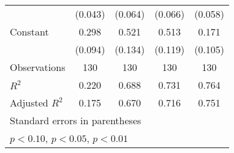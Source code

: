 \begin{table}[htbp]
\begin{tabular}{l*{4}{c}}
                    &     (0.043)         &     (0.064)         &     (0.066)         &     (0.058)         \\
[1em]
Constant            &       0.298\sym{***}&       0.521\sym{***}&       0.513\sym{***}&       0.171         \\
                    &     (0.094)         &     (0.134)         &     (0.119)         &     (0.105)         \\
\hline
Observations        &         130         &         130         &         130         &         130         \\
\(R^{2}\)           &       0.220         &       0.688         &       0.731         &       0.764         \\
Adjusted \(R^{2}\)  &       0.175         &       0.670         &       0.716         &       0.751         \\
\hline\hline
\multicolumn{5}{l}{\footnotesize Standard errors in parentheses}\\
\multicolumn{5}{l}{\footnotesize \sym{*} \(p<0.10\), \sym{**} \(p<0.05\), \sym{***} \(p<0.01\)}\\
\end{tabular}
\end{table}
